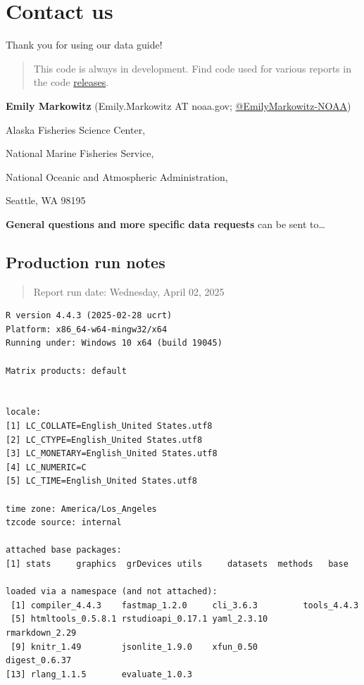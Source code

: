 \documentclass[
  letterpaper,
  oneside,
  open=any]{scrbook}
\begin{document}
\part{Contact us}

Thank you for using our data guide!

\begin{quote}
This code is always in development. Find code used for various reports
in the code
\href{https://github.com/IEA-Data/IEA_Data_Guidance_Doc//releases}{releases}.
\end{quote}

\textbf{Emily Markowitz} (Emily.Markowitz AT noaa.gov;
\href{https://github.com/EmilyMarkowitz-NOAA}{@EmilyMarkowitz-NOAA})

Alaska Fisheries Science Center,

National Marine Fisheries Service,

National Oceanic and Atmospheric Administration,

Seattle, WA 98195

\textbf{General questions and more specific data requests} can be sent
to\ldots{}

\hypertarget{production-run-notes}{%
\chapter{Production run notes}\label{production-run-notes}}

\begin{quote}
Report run date: Wednesday, April 02, 2025
\end{quote}

\begin{verbatim}
R version 4.4.3 (2025-02-28 ucrt)
Platform: x86_64-w64-mingw32/x64
Running under: Windows 10 x64 (build 19045)

Matrix products: default


locale:
[1] LC_COLLATE=English_United States.utf8 
[2] LC_CTYPE=English_United States.utf8   
[3] LC_MONETARY=English_United States.utf8
[4] LC_NUMERIC=C                          
[5] LC_TIME=English_United States.utf8    

time zone: America/Los_Angeles
tzcode source: internal

attached base packages:
[1] stats     graphics  grDevices utils     datasets  methods   base     

loaded via a namespace (and not attached):
 [1] compiler_4.4.3    fastmap_1.2.0     cli_3.6.3         tools_4.4.3      
 [5] htmltools_0.5.8.1 rstudioapi_0.17.1 yaml_2.3.10       rmarkdown_2.29   
 [9] knitr_1.49        jsonlite_1.9.0    xfun_0.50         digest_0.6.37    
[13] rlang_1.1.5       evaluate_1.0.3   
\end{verbatim}
\end{document}
